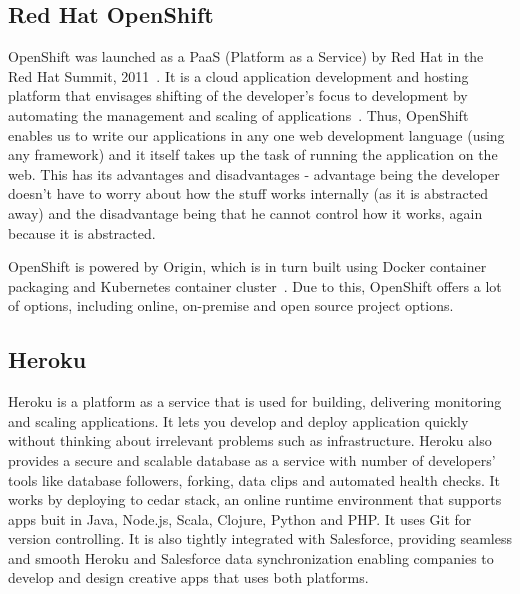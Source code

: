\subsection{Red Hat OpenShift}

OpenShift was launched as a PaaS (Platform as a Service) by Red Hat in
the Red Hat Summit, 2011~\cite{www-paas-openshift}.  It is a cloud
application development and hosting platform that envisages shifting
of the developer's focus to development by automating the management
and scaling of applications~\cite{www-developers-openshift}.  Thus,
OpenShift enables us to write our applications in any one web
development language (using any framework) and it itself takes up the
task of running the application on the web\cite{www-openshift}.  This
has its advantages and disadvantages - advantage being the developer
doesn't have to worry about how the stuff works internally (as it is
abstracted away) and the disadvantage being that he cannot control how
it works, again because it is abstracted.

OpenShift is powered by Origin, which is in turn built using Docker
container packaging and Kubernetes container
cluster~\cite{www-openshift-blog}.  Due to this, OpenShift offers a
lot of options, including online, on-premise and open source project
options.

    \pv
    
\subsection{Heroku}

    Heroku is a platform as a service that is used
    for building, delivering monitoring and
    scaling applications\cite{www-Heroku}. It
    lets you develop and deploy application quickly without thinking
    about irrelevant problems such as infrastructure. Heroku also
    provides a secure and scalable database as a service with number
    of developers’ tools like database followers, forking, data clips
    and automated health checks. It works by deploying to cedar stack,
    an online runtime environment that supports apps buit in Java,
    Node.js, Scala, Clojure, Python and PHP\cite{www-cedar}. It
    uses Git for version controlling. It is also tightly integrated
    with Salesforce, providing seamless and smooth Heroku and
    Salesforce data synchronization enabling companies to develop and
    design creative apps that uses both platforms.

   \pv

